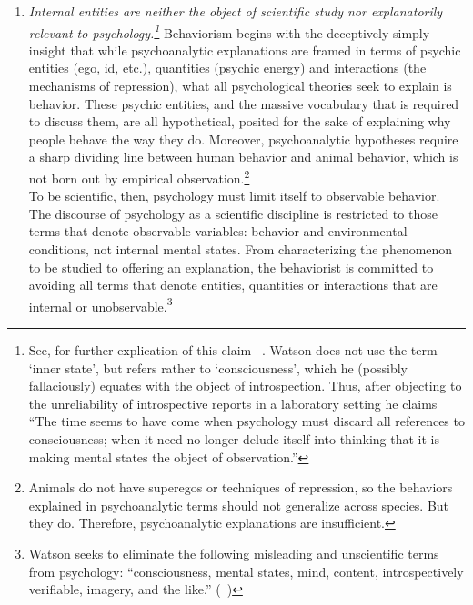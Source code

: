 \begin{refsection}
\begin{enumerate}
\item \emph{Internal entities are neither the object of scientific study nor explanatorily relevant to psychology.\footnote{See, for further explication of this claim ~\citep[p. 27--31]{Skinner:LehhdRQI}. Watson does not use the term `inner state', but refers rather to `consciousness', which he (possibly fallaciously) equates with the object of introspection. Thus, after objecting to the unreliability of introspective reports in a laboratory setting he claims “The time seems to have come when psychology must discard all references to consciousness; when it need no longer delude itself into thinking that it is making mental states the object of observation.”}} Behaviorism begins with the deceptively simply insight that while psychoanalytic explanations are framed in terms of psychic entities (ego, id, etc.), quantities (psychic energy) and interactions (the mechanisms of repression), what all psychological theories seek to explain is behavior. These psychic entities, and the massive vocabulary that is required to discuss them, are all hypothetical, posited for the sake of explaining why people behave the way they do. Moreover, psychoanalytic hypotheses require a sharp dividing line between human behavior and animal behavior, which is not born out by empirical observation.\footnote{Animals do not have superegos or techniques of repression, so the behaviors explained in psychoanalytic terms should not generalize across species. But they do. Therefore, psychoanalytic explanations are insufficient.}\\
To be scientific, then, psychology must limit itself to observable behavior. The discourse of psychology as a scientific discipline is restricted to those terms that denote observable variables: behavior and environmental conditions, not internal mental states. From characterizing the phenomenon to be studied to offering an explanation, the behaviorist is committed to avoiding all terms that denote entities, quantities or interactions that are internal or unobservable.\footnote{Watson seeks to eliminate the following misleading and unscientific terms from psychology: “consciousness, mental states, mind, content, introspectively verifiable, imagery, and the like.” (~\citep{Watson:1913tq})}\\

\end{enumerate}
\end{refsection}
